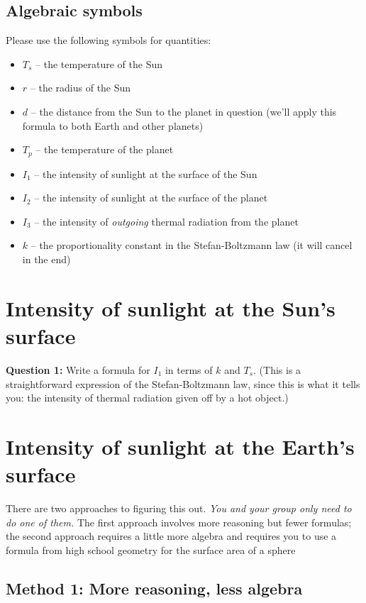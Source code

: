\documentclass[11pt]{article}
\def\BI{\begin{itemize}}
\def\EI{\end{itemize}}
\begin{document}
\subsection*{Algebraic symbols}

Please use the following symbols for quantities:

\BI
\item $T_s$ -- the temperature of the Sun
\item $r$ -- the radius of the Sun
\item $d$ -- the distance from the Sun to the planet in question (we'll apply this formula to both Earth and other planets)
\item $T_p$ -- the temperature of the planet
\item $I_1$ -- the intensity of sunlight at the surface of the Sun
\item $I_2$ -- the intensity of sunlight at the surface of the planet
\item $I_3$ -- the intensity of {\it outgoing} thermal radiation from the planet
\item $k$ -- the proportionality constant in the Stefan-Boltzmann law (it will cancel in the end)
\EI

\section*{Intensity of sunlight at the Sun's surface}

{\bf Question 1:} Write a formula for $I_1$ in terms of $k$ and $T_s$. (This is a straightforward expression of the Stefan-Boltzmann law, since this is what it tells you: the intensity of thermal radiation
given off by a hot object.)

\vspace*{2cm}

\hrulefill

\section*{Intensity of sunlight at the Earth's surface}

There are two approaches to figuring this out. {\it You and your group only need to do one of them.} The first approach involves
more reasoning but fewer formulas; the second approach requires a little more algebra and requires you to use a formula from
high school geometry for the surface area of a sphere

\newpage

\subsection*{Method 1: More reasoning, less algebra}
\end{document}
